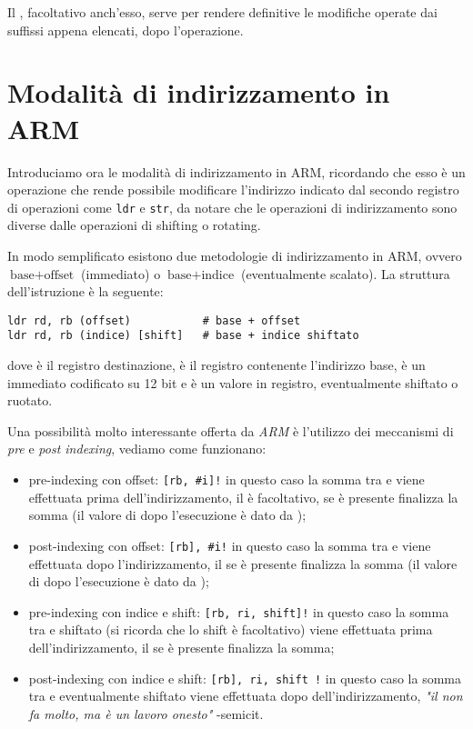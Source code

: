 \documentclass[class=book, crop=false, oneside]{standalone}
\begin{document}
Il \suffix{!}, facoltativo anch'esso, serve per rendere definitive le modifiche operate dai suffissi appena elencati, dopo l'operazione.

\section{Modalità di indirizzamento in ARM}
Introduciamo ora le modalità di indirizzamento in ARM, ricordando che esso è un operazione che rende possibile modificare l'indirizzo indicato dal secondo registro di operazioni come \texttt{ldr} e \texttt{str}, da notare che le operazioni di indirizzamento sono diverse dalle operazioni di shifting o rotating.

In modo semplificato esistono due metodologie di indirizzamento in ARM, ovvero \(\textrm{base} + \textrm{offset}\) (immediato) o \(\textrm{base} + \textrm{indice}\) (eventualmente scalato). La struttura dell'istruzione è la seguente:

\begin{verbatim}
ldr rd, rb (offset)           # base + offset
ldr rd, rb (indice) [shift]   # base + indice shiftato
\end{verbatim}
dove  è il registro destinazione,  è il registro contenente l'indirizzo base,  è un immediato codificato su 12 bit e  è un valore in registro, eventualmente shiftato o ruotato.

Una possibilità molto interessante offerta da \emph{ARM} è l'utilizzo dei meccanismi di \emph{pre} e \emph{post indexing}, vediamo come funzionano:

\begin{itemize}
	\item pre-indexing con offset: \texttt{[rb, \#i]!} in questo caso la somma tra  e  viene  effettuata prima dell'indirizzamento, il \register{!} è facoltativo, se è presente finalizza la somma (il valore di  dopo l'esecuzione è dato da );
	\item post-indexing con offset: \texttt{[rb], \#i!} in questo caso la somma tra  e  viene effettuata dopo l'indirizzamento, il \suffix{!} se è presente finalizza la somma (il valore di  dopo l'esecuzione è dato da );
	\item pre-indexing con indice e shift: \texttt{[rb, ri, shift]!} in questo caso la somma tra  e  shiftato (si ricorda che lo shift è facoltativo) viene  effettuata prima dell'indirizzamento, il \suffix{!} se è presente finalizza la somma;
	\item post-indexing con indice e shift: \texttt{[rb], ri, shift !} in questo caso la somma tra  e  eventualmente shiftato viene effettuata dopo dell'indirizzamento, \emph{"il \suffix{!} non fa molto, ma è un lavoro onesto"} -semicit.
\end{itemize}
\end{document}
